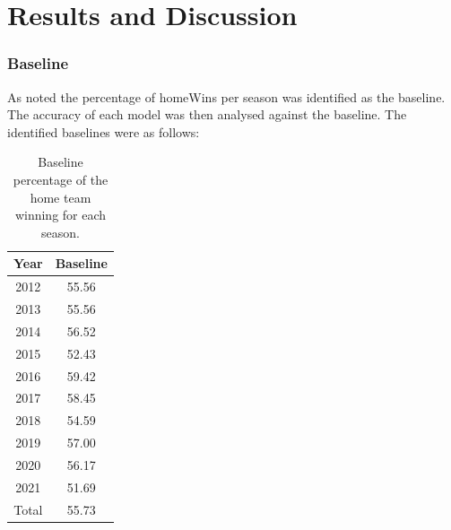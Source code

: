 \documentclass{imc-inf}
\begin{document}
	\chapter{Results and Discussion}\label{chap:Results}
	
	\subsection{Baseline}
	As noted the percentage of homeWins per season was identified as the baseline. The accuracy of each model was then analysed against the baseline. The identified baselines were as follows:
	\begin{table}[h!]
		\centering	
		\begin{tabular}{| c | c |}
			\hline
			Year & Baseline \\
			\hline
			2012 & 55.56\\
			\hline
			2013 & 55.56 \\
			\hline
			2014 & 56.52 \\
			\hline
			2015 & 52.43 \\
			\hline
			2016 & 59.42 \\
			\hline
			2017 & 58.45 \\
			\hline			
			2018 & 54.59 \\
			\hline
			2019 & 57.00 \\
			\hline
			2020 & 56.17 \\
			\hline			
			2021 & 51.69 \\
			\hline
			Total & 55.73 \\
			\hline
		\end{tabular}
		\caption{\label {tab:homeWin Baselines} Baseline percentage of the home team winning for each season.}		
	\end{table}
	
\end{document}
